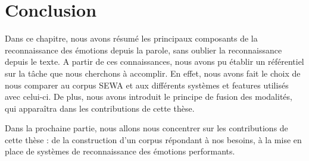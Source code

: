 %
%
%

%
% 
%

\section{Conclusion}
Dans ce chapitre, nous avons résumé les principaux composants de la reconnaissance des émotions depuis la parole, sans oublier la reconnaissance depuis le texte. A partir de ces connaissances, nous avons pu établir un référentiel sur la tâche que nous cherchons à accomplir. En effet, nous avons fait le choix de nous comparer au corpus SEWA et aux différents systèmes et features utilisés avec celui-ci. De plus, nous avons introduit le principe de fusion des modalités, qui apparaîtra dans les contributions de cette thèse.

Dans la prochaine partie, nous allons nous concentrer sur les contributions de cette thèse : de la construction d'un corpus répondant à nos besoins, à la mise en place de systèmes de reconnaissance des émotions performants.

